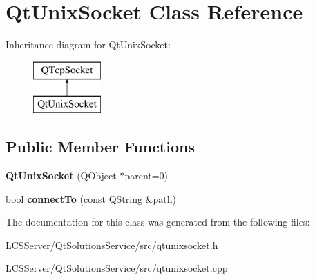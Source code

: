 \hypertarget{class_qt_unix_socket}{}\section{Qt\+Unix\+Socket Class Reference}
\label{class_qt_unix_socket}
Inheritance diagram for Qt\+Unix\+Socket\+:\begin{figure}[H]
\begin{center}
\leavevmode
\includegraphics[height=2.000000cm]{class_qt_unix_socket}
\end{center}
\end{figure}
\subsection*{Public Member Functions}
\begin{DoxyCompactItemize}
\item 
\mbox{\label{class_qt_unix_socket_a5c8729be0bb51069bc5011c131a3c396}} 
{\bfseries Qt\+Unix\+Socket} (Q\+Object $\ast$parent=0)
\item 
\mbox{\label{class_qt_unix_socket_a412e4407c955f2cfceabdae69f1626ff}} 
bool {\bfseries connect\+To} (const Q\+String \&path)
\end{DoxyCompactItemize}


The documentation for this class was generated from the following files\+:\begin{DoxyCompactItemize}
\item 
L\+C\+S\+Server/\+Qt\+Solutions\+Service/src/qtunixsocket.\+h\item 
L\+C\+S\+Server/\+Qt\+Solutions\+Service/src/qtunixsocket.\+cpp\end{DoxyCompactItemize}
